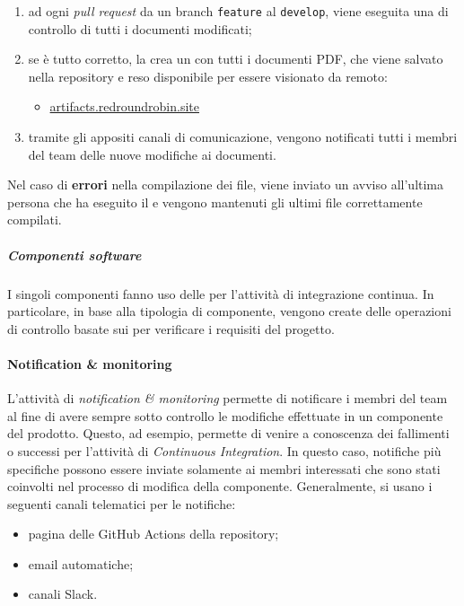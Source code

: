		\begin{enumerate}
			\item ad ogni \textit{pull request} da un branch \verb!feature! al \verb!develop!, viene eseguita una  di controllo di tutti i documenti modificati;
			\item se è tutto corretto, la  crea un  con tutti i documenti PDF, che viene salvato nella repository e reso disponibile per essere visionato da remoto:
			\begin{itemize}
				\item \href{https://artifacts.redroundrobin.site}{artifacts.redroundrobin.site}
			\end{itemize}
			\item tramite gli appositi canali di comunicazione, vengono notificati tutti i membri del team delle nuove modifiche ai documenti.
		\end{enumerate}

		Nel caso di \textbf{errori} nella compilazione dei file, viene inviato un avviso all'ultima persona che ha eseguito il  e vengono mantenuti gli ultimi file correttamente compilati.

		\subparagraph{Componenti software}

		I singoli componenti fanno uso delle  per l'attività di integrazione continua. In particolare, in base alla tipologia di componente, vengono create delle operazioni di controllo basate sui  per verificare i requisiti del progetto.
	

	\paragraph{Notification \& monitoring}

	L'attività di \textit{notification \& monitoring} permette di notificare i membri del team al fine di avere sempre sotto controllo le modifiche effettuate in un componente del prodotto. Questo, ad esempio, permette di venire a conoscenza dei fallimenti o successi per l'attività di \textit{Continuous Integration}. In questo caso, notifiche più specifiche possono essere inviate solamente ai membri interessati che sono stati coinvolti nel processo di modifica della componente. 
	\newline
	Generalmente, si usano i seguenti canali telematici per le notifiche:
	\begin{itemize}
		\item pagina delle GitHub Actions della repository;
		\item email automatiche;
		\item canali Slack.
	\end{itemize}


